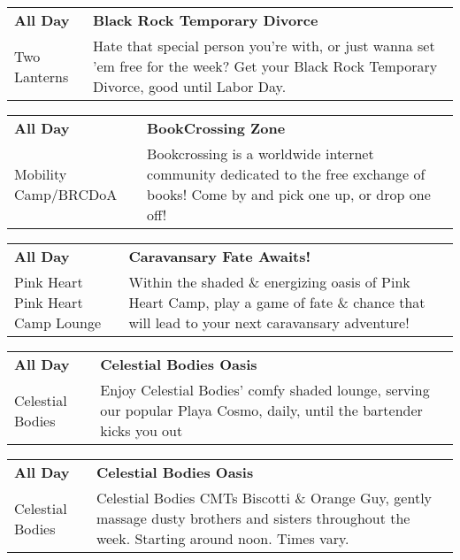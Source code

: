 \begin{tabular}{ p{1in} p{2.2in} }
    \textbf{All Day} & \textbf{Black Rock Temporary Divorce} \\
    Two Lanterns \newline  & Hate that special person you're with, or just wanna set 'em free for the
week? Get your Black Rock Temporary Divorce, good until Labor Day. \\
    \hline 
\end{tabular}
    
\begin{tabular}{ p{1in} p{2.2in} }
    \textbf{All Day} & \textbf{BookCrossing Zone} \\
    Mobility Camp/BRCDoA \newline  & Bookcrossing is a worldwide internet community dedicated to the free exchange of books! Come by and pick one up, or drop one off! \\
    \hline 
\end{tabular}
    
\begin{tabular}{ p{1in} p{2.2in} }
    \textbf{All Day} & \textbf{Caravansary Fate Awaits!} \\
    Pink Heart \newline Pink Heart Camp Lounge & Within the shaded \& energizing oasis of Pink Heart Camp, play a game of fate \& chance that will lead to your next caravansary adventure! \\
    \hline 
\end{tabular}
    
\begin{tabular}{ p{1in} p{2.2in} }
    \textbf{All Day} & \textbf{Celestial Bodies Oasis} \\
    Celestial Bodies \newline  & Enjoy Celestial Bodies' comfy shaded lounge, serving our popular Playa Cosmo, daily, until the bartender kicks you out {\char9786} \\
    \hline 
\end{tabular}
    
\begin{tabular}{ p{1in} p{2.2in} }
    \textbf{All Day} & \textbf{Celestial Bodies Oasis} \\
    Celestial Bodies \newline  & Celestial Bodies CMTs Biscotti \& Orange Guy, gently massage dusty brothers and sisters throughout the week. Starting around noon. Times vary. \\
    \hline 
\end{tabular}
    
